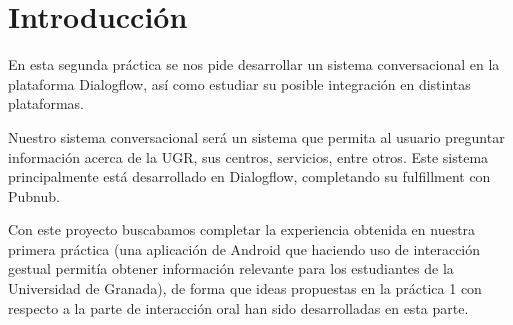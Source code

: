 \section{Introducción}

En esta segunda práctica se nos pide desarrollar un sistema conversacional en la plataforma Dialogflow, así como estudiar su posible integración en distintas plataformas.

Nuestro sistema conversacional será un sistema que permita al usuario preguntar información acerca de la UGR, sus centros, servicios, entre otros. Este sistema principalmente está desarrollado en Dialogflow, completando su fulfillment con Pubnub.

Con este proyecto buscabamos completar la experiencia obtenida en nuestra primera práctica (una aplicación de Android que haciendo uso de interacción gestual permitía obtener información relevante para los estudiantes de la Universidad de Granada), de forma que ideas propuestas en la práctica 1 con respecto a la parte de interacción oral han sido desarrolladas en esta parte.


